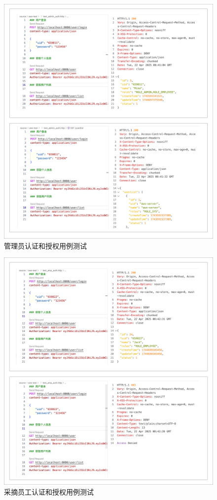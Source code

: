 \begin{figure}
    \centering
    \includegraphics[width=0.9\linewidth]{../result/user-auth-admin.png}
    \caption{管理员认证和授权用例测试}
    \label{fig:user-auth-admin}
\end{figure}

\begin{figure}
    \centering
    \includegraphics[width=0.9\linewidth]{../result/user-auth-emp.png}
    \caption{采摘员工认证和授权用例测试}
    \label{fig:user-auth-emp}
\end{figure}

